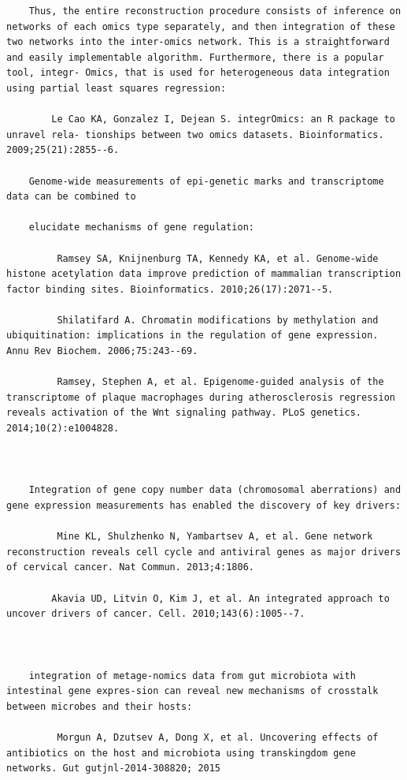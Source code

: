 \documentclass[
]{book}
\begin{document}
\begin{verbatim}
    Thus, the entire reconstruction procedure consists of inference on networks of each omics type separately, and then integration of these two networks into the inter-omics network. This is a straightforward and easily implementable algorithm. Furthermore, there is a popular tool, integr- Omics, that is used for heterogeneous data integration using partial least squares regression:

        Le Cao KA, Gonzalez I, Dejean S. integrOmics: an R package to unravel rela- tionships between two omics datasets. Bioinformatics. 2009;25(21):2855--6.

    Genome-wide measurements of epi-genetic marks and transcriptome data can be combined to

    elucidate mechanisms of gene regulation:

         Ramsey SA, Knijnenburg TA, Kennedy KA, et al. Genome-wide histone acetylation data improve prediction of mammalian transcription factor binding sites. Bioinformatics. 2010;26(17):2071--5.

         Shilatifard A. Chromatin modifications by methylation and ubiquitination: implications in the regulation of gene expression. Annu Rev Biochem. 2006;75:243--69.

         Ramsey, Stephen A, et al. Epigenome-guided analysis of the transcriptome of plaque macrophages during atherosclerosis regression reveals activation of the Wnt signaling pathway. PLoS genetics. 2014;10(2):e1004828.



    Integration of gene copy number data (chromosomal aberrations) and gene expression measurements has enabled the discovery of key drivers:

         Mine KL, Shulzhenko N, Yambartsev A, et al. Gene network reconstruction reveals cell cycle and antiviral genes as major drivers of cervical cancer. Nat Commun. 2013;4:1806.

        Akavia UD, Litvin O, Kim J, et al. An integrated approach to uncover drivers of cancer. Cell. 2010;143(6):1005--7.



    integration of metage-nomics data from gut microbiota with intestinal gene expres-sion can reveal new mechanisms of crosstalk between microbes and their hosts:

         Morgun A, Dzutsev A, Dong X, et al. Uncovering effects of antibiotics on the host and microbiota using transkingdom gene networks. Gut gutjnl-2014-308820; 2015
\end{verbatim}
\end{document}
